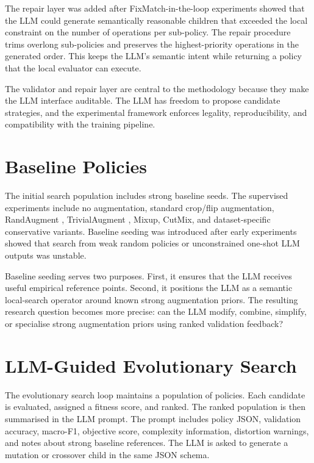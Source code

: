 \documentclass[12pt,a4paper]{report}
\begin{document}
The repair layer was added after FixMatch-in-the-loop experiments showed that the LLM could generate semantically reasonable children that exceeded the local constraint on the number of operations per sub-policy. The repair procedure trims overlong sub-policies and preserves the highest-priority operations in the generated order. This keeps the LLM's semantic intent while returning a policy that the local evaluator can execute.

The validator and repair layer are central to the methodology because they make the LLM interface auditable. The LLM has freedom to propose candidate strategies, and the experimental framework enforces legality, reproducibility, and compatibility with the training pipeline.

\section{Baseline Policies}

The initial search population includes strong baseline seeds. The supervised experiments include no augmentation, standard crop/flip augmentation, RandAugment \citep{cubuk2020randaugment}, TrivialAugment \citep{muller2021trivialaugment}, Mixup, CutMix, and dataset-specific conservative variants. Baseline seeding was introduced after early experiments showed that search from weak random policies or unconstrained one-shot LLM outputs was unstable.

Baseline seeding serves two purposes. First, it ensures that the LLM receives useful empirical reference points. Second, it positions the LLM as a semantic local-search operator around known strong augmentation priors. The resulting research question becomes more precise: can the LLM modify, combine, simplify, or specialise strong augmentation priors using ranked validation feedback?

\section{LLM-Guided Evolutionary Search}

The evolutionary search loop maintains a population of policies. Each candidate is evaluated, assigned a fitness score, and ranked. The ranked population is then summarised in the LLM prompt. The prompt includes policy JSON, validation accuracy, macro-F1, objective score, complexity information, distortion warnings, and notes about strong baseline references. The LLM is asked to generate a mutation or crossover child in the same JSON schema.
\end{document}
